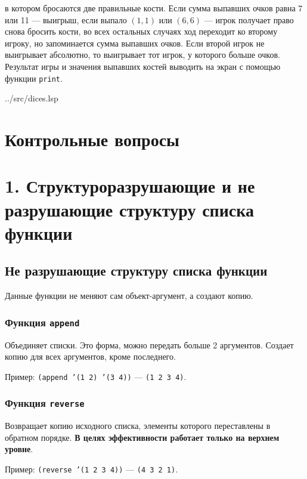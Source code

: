 в котором бросаются две правильные кости. Если сумма выпавших очков равна 7 или 11 --- выигрыш, если выпало $(1, 1)$ или $(6, 6)$ --- игрок получает право снова бросить кости, во всех остальных случаях ход переходит ко второму игроку, но запоминается сумма выпавших очков. Если второй игрок не выигрывает абсолютно, то выигрывает тот игрок, у которого больше очков. Результат игры и значения выпавших костей выводить на экран с помощью функции \texttt{print}.

\clearpage
\begin{lstinputlisting}[
	caption={Задание 5},
	label={lst:t5},
	style={lsp},
	linerange={1-44},
	]{../src/dices.lsp}
\end{lstinputlisting}

\section*{Контрольные вопросы}

\section*{1. Структуроразрушающие и не разрушающие структуру списка функции}

\subsection*{Не разрушающие структуру списка функции}

Данные функции не меняют сам объект-аргумент, а создают копию.

\subsubsection*{Функция \texttt{append}}

Объединяет списки. Это форма, можно передать больше 2 аргументов. Создает копию для всех аргументов, кроме последнего.

Пример: \texttt{(append '(1 2) '(3 4))} --- \texttt{(1 2 3 4)}.

\subsubsection*{Функция \texttt{reverse}}

Возвращает копию исходного списка, элементы которого переставлены в обратном порядке. \textbf{В целях эффективности работает только на верхнем уровне}.

Пример: \texttt{(reverse '(1 2 3 4))} --- \texttt{(4 3 2 1)}.

